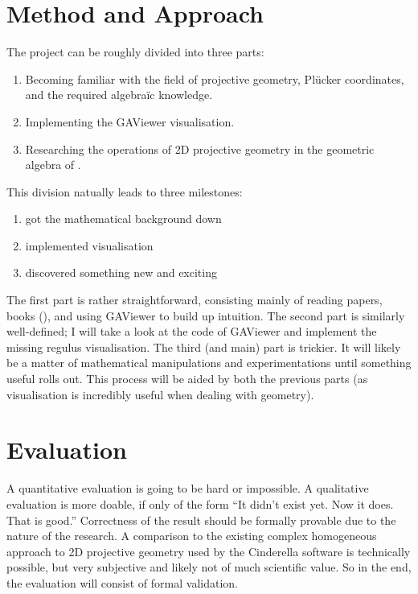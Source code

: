 \documentclass[a4paper, 10pt]{article}
\begin{document}
\section{Method and Approach}
The project can be roughly divided into three parts:
\begin{enumerate}
\item Becoming familiar with the field of projective geometry, Pl\"{u}cker
  coordinates, and the required algebra\"{i}c knowledge.
\item Implementing the GAViewer visualisation.
\item Researching the operations of 2D projective geometry in the geometric
  algebra of \rp.
\end{enumerate}
This division natually leads to three milestones:
\begin{enumerate}
\item got the mathematical background down
\item implemented visualisation
\item discovered something new and exciting
\end{enumerate}

The first part is rather straightforward, consisting mainly of reading papers,
books (\cite{dorst2009geometric}), and using GAViewer to build up intuition.
The second part is similarly well-defined; I will take a look at the code of
GAViewer and implement the missing regulus visualisation. The third (and main)
part is trickier. It will likely be a matter of mathematical manipulations and
experimentations until something useful rolls out. This process will be aided by
both the previous parts (as visualisation is incredibly useful when dealing with
geometry).

\section{Evaluation}
A quantitative evaluation is going to be hard or impossible. A qualitative
evaluation is more doable, if only of the form ``It didn't exist yet. Now it
does. That is good.'' Correctness of the result should be formally
provable due to the nature of the research. A comparison to the
existing complex homogeneous approach to 2D projective geometry used
by the Cinderella software is technically possible, but very
subjective and likely not of much scientific value. So in the end, the
evaluation will consist of formal validation.
\end{document}
